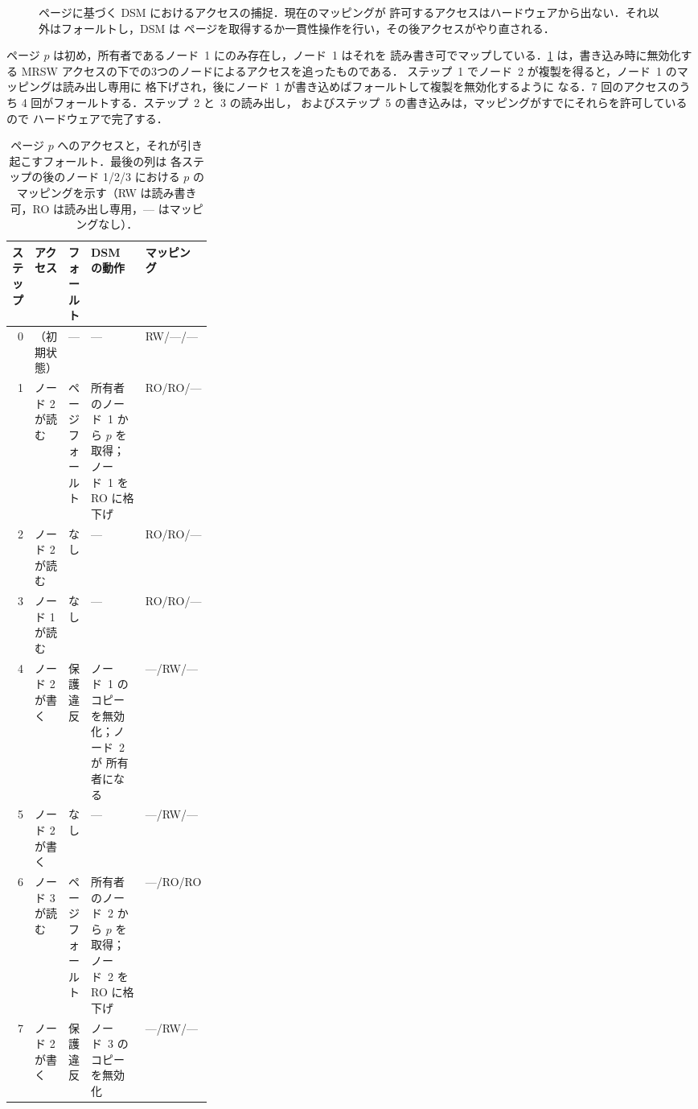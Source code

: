 \documentclass[../main.tex]{subfiles}
\begin{document}
\begin{figure}[htbp]
  \centering
  
  \caption{ページに基づく DSM におけるアクセスの捕捉．現在のマッピングが
    許可するアクセスはハードウェアから出ない．それ以外はフォールトし，DSM は
    ページを取得するか一貫性操作を行い，その後アクセスがやり直される．}
  \label{fig:l15-mmu}
\end{figure}

\begin{example}
  ページ $p$ は初め，所有者であるノード~1 にのみ存在し，ノード~1 はそれを
  読み書き可でマップしている．\cref{tab:l15-mmu} は，書き込み時に無効化する
  MRSW アクセスの下での3つのノードによるアクセスを追ったものである．
  ステップ~1 でノード~2 が複製を得ると，ノード~1 のマッピングは読み出し専用に
  格下げされ，後にノード~1 が書き込めばフォールトして複製を無効化するように
  なる．7 回のアクセスのうち 4 回がフォールトする．ステップ~2 と~3 の読み出し，
  およびステップ~5 の書き込みは，マッピングがすでにそれらを許可しているので
  ハードウェアで完了する．
\end{example}

\begin{table}[htbp]
  \centering
  \caption{ページ $p$ へのアクセスと，それが引き起こすフォールト．最後の列は
    各ステップの後のノード 1/2/3 における $p$ のマッピングを示す（RW は読み書き
    可，RO は読み出し専用，--- はマッピングなし）．}
  \label{tab:l15-mmu}
  \small
  \setlength{\tabcolsep}{4pt}
  \begin{tabular}{@{}rll>{\raggedright\arraybackslash}p{0.29\linewidth}l@{}}
    \toprule
    ステップ & アクセス & フォールト & DSM の動作 & マッピング \\
    \midrule
    0 & （初期状態） & --- & --- & RW/---/--- \\
    1 & ノード 2 が読む & ページフォールト & 所有者のノード~1 から $p$ を
      取得；ノード~1 を RO に格下げ & RO/RO/--- \\
    2 & ノード 2 が読む & なし & --- & RO/RO/--- \\
    3 & ノード 1 が読む & なし & --- & RO/RO/--- \\
    4 & ノード 2 が書く & 保護違反 & ノード~1 のコピーを無効化；ノード~2 が
      所有者になる & ---/RW/--- \\
    5 & ノード 2 が書く & なし & --- & ---/RW/--- \\
    6 & ノード 3 が読む & ページフォールト & 所有者のノード~2 から $p$ を
      取得；ノード~2 を RO に格下げ & ---/RO/RO \\
    7 & ノード 2 が書く & 保護違反 & ノード~3 のコピーを無効化 &
      ---/RW/--- \\
    \bottomrule
  \end{tabular}
\end{table}
\end{document}

